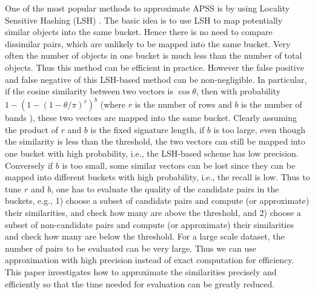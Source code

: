 \documentclass{article}
\begin{document}
{\color{black}
One of the most popular methods to approximate APSS is by using Locality Sensitive Hashing (LSH) \cite{LRU14}. The basic idea is to use LSH to map potentially similar objects into the same bucket. Hence there is no need to compare dissimilar pairs, which are unlikely to be mapped into the same bucket. Very often the number of objects in one bucket is much less than the number of total objects. Thus this method can be efficient in practice. However the false positive and false negative of this LSH-based method can be non-negligible. In particular, if the cosine similarity between two vectors is $\cos \theta$, then with probability $1-(1-(1-\theta/\pi)^r)^b$ (where $r$ is the number of rows and $b$ is the number of bands \cite{LRU14}), these two vectors are mapped into the same bucket. Clearly assuming the product of $r$ and $b$ is the fixed signature length, if $b$ is too large, even though the similarity is less than the threshold, the two vectors can still be mapped into one bucket with high probability, i.e., the LSH-based scheme has low precision. Conversely if $b$ is too small, some similar vectors can be lost since they can be mapped into different buckets with high probability, i.e., the recall is low. Thus to tune $r$ and $b$, one has to evaluate the quality of the candidate pairs in the buckets, e.g., 1) choose a subset of candidate pairs and compute (or approximate) their similarities, and check how many are above the threshold, and 2) choose a subset of non-candidate pairs and compute (or approximate) their similarities and check how many are below the threshold. For a large scale dataset, the number of pairs to be evaluated can be very large. Thus we can use approximation with high precision instead of exact computation for efficiency. This paper investigates how to approximate the similarities precisely and efficiently so that the time needed for evaluation can be greatly reduced.
}
\end{document}
